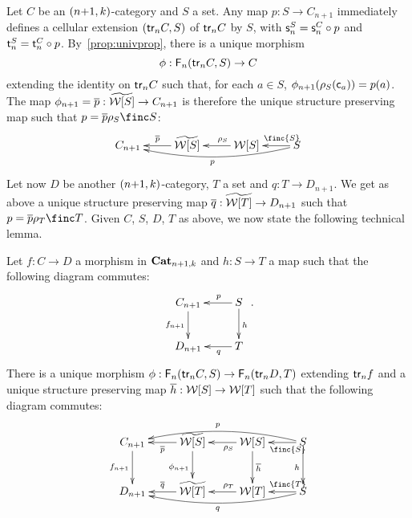 \begin{paragr}\label{paragr:addproperties}
  Let $C$ be an $(n{+}1,k)$-category and $S$ a set. Any map
  $p:S\to C_{n+1}$ immediately defines a cellular extension $(\mathsf{tr}_{n} C,S)$ of
  $\mathsf{tr}_{n} C$ by $S$, with $\mathsf{s}_{n}^S=\mathsf{s}_{n}^C\circ p$ and $\mathsf{t}_{n}^S=\mathsf{t}_{n}^C\circ p$. By~\cref{prop:univprop}, there is a unique
  morphism
  \[\phi:\mathsf{F}_{n}(\mathsf{tr}_{n}C,S)\to C\]
  extending the identity on $\mathsf{tr}_{n} C$ such that, for each $a\in S$,
  $\phi_{n+1}(\rho_{S}(\mathsf{c}_{a}))=p(a)$. The map
  $\phi_{n+1}=\overline{p}:\widetilde{\mathcal{W}[S]}\to C_{n+1}$ is therefore the unique
 structure preserving map such that $p=\extend p\cans S\finc S$:
  \[
    \xymatrix{C_{n+1} & \wtxeq S\ar[l]_{\extend{p}} & \wtx S
      \ar[l]_(.4){\cans{S}} & S\ar[l]_(.3){\finc{S}} \ar@/^1em/[lll]^p}
  \]
 Let now $D$ be another $(n{+}1,k)$-category, $T$ a set and
 $q:T\to D_{n+1}$. We get as above a unique structure preserving map
 $\overline{q}:\widetilde{\mathcal{W}[T]}\to D_{n+1}$ such that $p=\extend p\cans T\finc
 T$. Given $C$, $S$, $D$, $T$ as above, we now state the following
 technical lemma.
 \begin{lemma}\label{lemma:tech}
   Let $f:C\to D$ a morphism in $\mathbf{Cat}_{n+1,k}$ and  $h:S\to T$ a
   map such that the following diagram commutes:
   \[
     \xymatrix{C_{n+1} \ar[d]_{f_{n+1}}& S\ar[d]^h\ar[l]_(.4){p}\\
       D_{n+1} & T\ar[l]^(.4){q}}.
   \]
   There is a  unique morphism $\phi:\mathsf{F}_{n}(\mathsf{tr}_{n} C,S)\to \mathsf{F}_{n}(\mathsf{tr}_{n} D,T)$ extending $\mathsf{tr}_{n} f$ and a unique structure preserving map $\overline{h}:\mathcal{W}[S]\to\mathcal{W}[T]$ such that the following diagram commutes:
    \begin{equation}
     \label{eq:tech}
     \xymatrix{
     C_{n+1} \ar[d]_{f_{n+1}}& \wtxeq S\ar[l]^{\extend{p}}\ar[d]_{\phi_{n+1}} & \wtx S
      \ar[l]^(.4){\cans{S}}\ar[d]^{\extend h} & S\ar[l]^(.3){\finc{S}}
      \ar@/_1em/[lll]_p\ar[d]_h\\
      D_{n+1} & \wtxeq T\ar[l]_{\extend{q}} & \wtx T
      \ar[l]_(.4){\cans{T}} & S\ar[l]_(.3){\finc{T}} \ar@/^1em/[lll]^q}
     \end{equation}
   
   
 \end{lemma}
 
  
\end{paragr}
  
 

 
 








 
 
 
